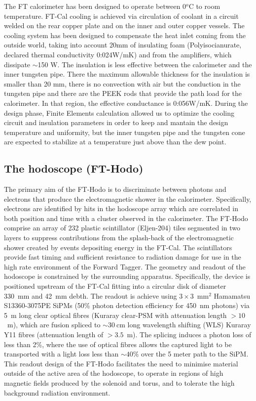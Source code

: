 The FT calorimeter has been designed to operate
between 0$^o$C to room temperature. FT-Cal cooling  is achieved via circulation
of coolant in a circuit welded on the rear copper
plate and on the inner and outer copper
vessels. The cooling system has been designed
to compensate the heat inlet coming
from the outside world, taking into account
20mm of insulating foam (Polyisocianurate,
declared thermal conductivity 0:024W/mK)
and from the amplifiers, which  dissipate $\sim$150 W.
The insulation is less effective between the
calorimeter and the inner tungsten pipe. There
the maximum allowable thickness for the insulation
is smaller than 20 mm, there is no
convection with air but the conduction in the
tungsten pipe and there are the PEEK rods
that provide the path load for the calorimeter.
In that region, the effective conductance
is 0:056W/mK.
During the design phase, Finite Elements calculation 
allowed us to optimize the cooling circuit and insulation parameters in order to keep and mantain the 
design temperature and
uniformity, but the inner tungsten pipe and
the tungsten cone are expected to stabilize
at a temperature just above than the dew
point.


\subsection{The hodoscope (FT-Hodo)}
The primary aim of the FT-Hodo is to discriminate between photons and electrons that produce the electromagnetic shower in the calorimeter. Specifically, electrons are identified by hits in the hodoscope array which are correlated in both position and time with a cluster observed in the calorimeter. The FT-Hodo comprise an array of 232 plastic scintillator (Eljen-204) tiles segmented in two layers to suppress contributions from the splash-back of the electromagnetic shower created by events depositing energy in the FT-Cal. The scintillators provide fast timing and sufficient resistance to radiation damage for use in the high rate environment of the Forward Tagger. The geometry and readout of the hodoscope is constrained by the surrounding apparatus. Specifically, the device is positioned upstream of the FT-Cal fitting into a circular disk of diameter 330~mm and 42~mm debth. The readout is achieve using $3\times 3$~mm$^2$ Hamamatsu S13360-3075PE SiPMs (50\% photon detection efficiency for 450~nm photons) via 5~m long clear optical fibres (Kuraray clear-PSM with attenuation length $>10$~m), which are fusion spliced to $\sim 30~$cm long wavelength shifting (WLS) Kuraray Y11 fibres (attenuation length of $> 3.5$~m). The splicing induces a photon loss of less than 2\%, where the use of optical fibres allows the captured light to be transported with a light loss less than $\sim40\%$ over the 5 meter path to the SiPM. This readout design of the FT-Hodo facilitates the need to minimise material outside of the active area of the hodoscope, to operate in regions of high magnetic fields produced by the solenoid and torus, and to tolerate the high background radiation environment. 


